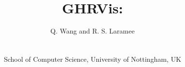 \documentclass{egpubl}
\author[Q. Wang \& R. S. Laramee]
{\parbox{\textwidth}{\centering Q. Wang
  and R. S. Laramee
    }
    \\
\parbox{\textwidth}{\centering School of Computer Science, University of Nottingham, UK}
}
\title{GHRVis:}
\begin{document}
\pagestyle{plain}

\let\origsection=\section
\renewcommand\section[1]{\origsection{#1}\label{sec:{#1}}}

\let\origsubsection=\subsection
\renewcommand\subsection[1]{\origsubsection{#1}\label{subsec:{#1}}}

\let\origsubsubsection=\subsubsection
\renewcommand\subsubsection[1]{\origsubsubsection{#1}\label{subsubsec:{#1}}}

\newcommand{\figureref}[1]{Figure \ref{#1}}
\newcommand{\tableref}[1]{Table \ref{#1}}
\newcommand{\phantomref}[1]{$\hyperref[#1]{\ref{#1}}$}

\newcommand{\bobgraph}[1]{ \noindent\textbf{#1} \phantomsection \label{bobgraph:{#1}}}

\newcommand{\mycolorbox}[2]{\begingroup\setlength{\fboxsep}{2pt}\colorbox{#1}{#2}\endgroup}

\newcommand{\citea}[1]{\citeauthor{#1}\cite{#1}}

\newcommand{\theaderR}[1]{\multicolumn{1}{c|}{\cellcolor{Mycolor3} \textbf{\rotatebox{90}{#1 \phantom{-} }}}}
\newcommand{\theaderP}[1]{\cellcolor{Mycolor3} \textbf{#1}}

\newcommand{\note}[1]{\textcolor{blue}{#1}}
\end{document}
